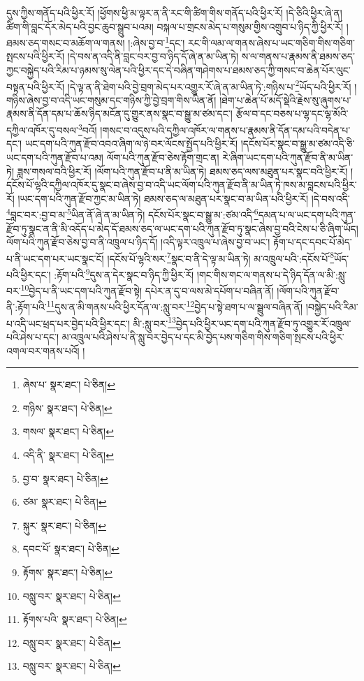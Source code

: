 དུས་ཀྱིས་གནོད་པའི་ཕྱིར་རོ། །ཕྱོགས་ཕྱི་མ་ལྟར་ན་ནི་རང་གི་ཚིག་གིས་གནོད་པའི་ཕྱིར་རོ། །དེ་ཅིའི་ཕྱིར་ཞེ་ན། ཚིག་གི་བླང་དོར་མེད་པའི་བྱང་ཆུབ་སྒྲུབ་པའམ། བསྐལ་པ་གྲངས་མེད་པ་གསུམ་གྱིས་འགྲུབ་པ་ཉིད་ཀྱི་ཕྱིར་རོ། །ཐམས་ཅད་གསང་བ་མཆོག་ལ་གནས། །:ཞེས་བྱ་བ་\footnote{ཞེས་པ་  སྣར་ཐང་།  པེ་ཅིན། }དང་། རང་གི་ལམ་ལ་གནས་ཞེས་པ་ཡང་གཅིག་གིས་གཅིག་སྤངས་པའི་ཕྱིར་རོ། །དེ་བས་ན་འདི་ནི་བླང་བར་བྱ་བ་ཉིད་དོ་ཞེ་ན་མ་ཡིན་ཏེ། ས་ལ་གནས་པ་རྣམས་ནི་ཐམས་ཅད་ཀྱང་བསྐྱེད་པའི་རིམ་པ་ཉམས་སུ་ལེན་པའི་ཕྱིར་དང་དེ་བཞིན་གཤེགས་པ་ཐམས་ཅད་ཀྱི་གསང་བ་ཆེན་པོར་ལུང་བསྟན་པའི་ཕྱིར་རོ། །དེ་ལྟ་ན་ནི་ཐེག་པའི་བྱེ་བྲག་མེད་པར་འགྱུར་རོ་ཞེ་ན་མ་ཡིན་ཏེ་:གཉིས་པ་\footnote{གཉིས་  སྣར་ཐང་།  པེ་ཅིན། }ཡོད་པའི་ཕྱིར་རོ། །གཉིས་ཞེས་བྱ་བ་འདི་ཡང་གསུམ་དང་གཉིས་ཀྱི་བྱེ་བྲག་གིས་ཡིན་ནོ། །ཐེག་པ་ཆེན་པོ་མདོ་སྡེའི་རྗེས་སུ་ཞུགས་པ་རྣམས་ནི་དོན་དམ་པ་ཆོས་ཉིད་མངོན་དུ་གྱུར་ནས་སྣང་བ་སྒྱུ་མ་ཙམ་དང་། རྩོལ་བ་དང་བཅས་པ་ལྷ་དང་ལྷ་མོའི་དཀྱིལ་འཁོར་དུ་བསལ་\footnote{གསལ་  སྣར་ཐང་།  པེ་ཅིན། }བའོ། །གསང་བ་འདུས་པའི་དཀྱིལ་འཁོར་ལ་གནས་པ་རྣམས་ནི་དོན་དམ་པའི་བདེན་པ་དང་། ཡང་དག་པའི་ཀུན་རྫོབ་འབའ་ཞིག་ལ་ཉེ་བར་ལོངས་སྤྱོད་པའི་ཕྱིར་རོ། །དངོས་པོར་སྣང་བ་སྒྱུ་མ་ཙམ་འདི་ཅི་ཡང་དག་པའི་ཀུན་རྫོབ་པ་འམ། ལོག་པའི་ཀུན་རྫོབ་ཅེས་རྟོག་གྲང་ན། རེ་ཞིག་ཡང་དག་པའི་ཀུན་རྫོབ་ནི་མ་ཡིན་ཏེ། ཟླས་གསལ་བའི་ཕྱིར་རོ། །ལོག་པའི་ཀུན་རྫོབ་པ་ནི་མ་ཡིན་ཏེ། ཐམས་ཅད་ལས་མཐུན་པར་སྣང་བའི་ཕྱིར་རོ། །དངོས་པོ་ལྷའི་དཀྱིལ་འཁོར་དུ་སྣང་བ་ཞེས་བྱ་བ་འདི་ཡང་ལོག་པའི་ཀུན་རྫོབ་ནི་མ་ཡིན་ཏེ་ཁས་མ་བླངས་པའི་ཕྱིར་རོ། །ཡང་དག་པའི་ཀུན་རྫོབ་ཀྱང་མ་ཡིན་ཏེ། ཐམས་ཅད་ལ་མཐུན་པར་སྣང་བ་མ་ཡིན་པའི་ཕྱིར་རོ། །དེ་བས་འདི་\footnote{འདི་ནི་  སྣར་ཐང་།  པེ་ཅིན། }བླང་བར་:བྱ་བ་མ་\footnote{བྱ་བ་  སྣར་ཐང་།  པེ་ཅིན། }ཡིན་ནོ་ཞེ་ན་མ་ཡིན་ཏེ། དངོས་པོར་སྣང་བ་སྒྱུ་མ་:ཙམ་འདི་\footnote{ཙམ་  སྣར་ཐང་།  པེ་ཅིན། }དམན་པ་ལ་ཡང་དག་པའི་ཀུན་རྫོབ་ཏུ་སྣང་ན་ནི་མི་འདོད་པ་མེད་དོ་ཐམས་ཅད་ལ་ཡང་དག་པའི་ཀུན་རྫོབ་ཏུ་སྣང་ཞེས་བྱ་བའི་ངེས་པ་ཅི་ཞིག་ཡོད། ལོག་པའི་ཀུན་རྫོབ་ཅེས་བྱ་བ་ནི་འཁྲུལ་པ་ཉིད་དོ། །འདི་ལྟར་འཁྲུལ་པ་ཞེས་བྱ་བ་ཡང་། རྟོག་པ་དང་དབང་པོ་མེད་པ་ནི་ཡང་དག་པར་ཡང་སྣང་ངོ། །དངོས་པོ་ལྷའི་སར་\footnote{སྐུར་  སྣར་ཐང་།  པེ་ཅིན། }སྣང་བ་ནི་དེ་ལྟ་མ་ཡིན་ཏེ། མ་འཁྲུལ་པའི་:དངོས་པོ་\footnote{དབང་པོ་  སྣར་ཐང་།  པེ་ཅིན། }ཡོད་པའི་ཕྱིར་དང་། :རྟོག་པའི་\footnote{རྟོགས་  སྣར་ཐང་།  པེ་ཅིན། }དུས་ན་དེར་སྣང་བ་ཉིད་ཀྱི་ཕྱིར་རོ། །གང་གིས་གང་ལ་གནས་པ་དེ་ཉིད་དོན་ལ་མི་:སླུ་བར་\footnote{བསླུ་བར་  སྣར་ཐང་།  པེ་ཅིན། }བྱེད་པ་ནི་ཡང་དག་པའི་ཀུན་རྫོབ་སྟེ། དཔེར་ན་དུ་བ་ལས་མེ་དཔོག་པ་བཞིན་ནོ། །ལོག་པའི་ཀུན་རྫོབ་ནི་:རྟོག་པའི་\footnote{རྟོགས་པའི་  སྣར་ཐང་།  པེ་ཅིན། }དུས་ན་མི་གནས་པའི་ཕྱིར་དོན་ལ་:སླུ་བར་\footnote{བསླུ་བར་  སྣར་ཐང་།  པེ་ཅིན། }བྱེད་པ་སྟེ་ཐག་པ་ལ་སྦྲུལ་བཞིན་ནོ། །བསྐྱེད་པའི་རིམ་པ་འདི་ཡང་ཕྲད་པར་བྱེད་པའི་ཕྱིར་དང་། མི་:སླུ་བར་\footnote{བསླུ་བར་  སྣར་ཐང་།  པེ་ཅིན། }བྱེད་པའི་ཕྱིར་ཡང་དག་པའི་ཀུན་རྫོབ་ཏུ་འགྱུར་རོ་འཁྲུལ་པའི་ཤེས་པ་དང་། མ་འཁྲུལ་པའི་ཤེས་པ་ནི་སླུ་བར་བྱེད་པ་དང་མི་བྱེད་པས་གཅིག་གིས་གཅིག་སྤངས་པའི་ཕྱིར་འགལ་བར་གནས་པའོ། །
